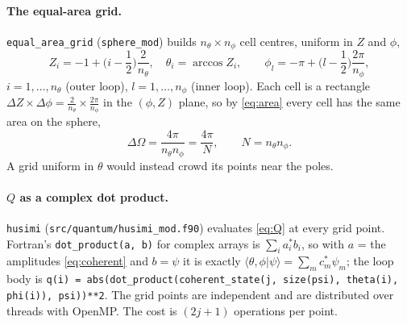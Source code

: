 \documentclass[11pt,a4paper]{article}
\begin{document}
\paragraph{The equal-area grid.} \texttt{equal\_area\_grid} (\texttt{sphere\_mod}) builds $n_\theta\times n_\phi$ cell
centres, uniform in $Z$ and $\phi$,
\begin{equation}\label{eq:grid}
  Z_i = -1 + \Big(i-\frac12\Big)\frac{2}{n_\theta},\quad \theta_i = \arccos Z_i,\qquad
  \phi_l = -\pi + \Big(l-\frac12\Big)\frac{2\pi}{n_\phi},
\end{equation}
$i = 1,\dots,n_\theta$ (outer loop), $l = 1,\dots,n_\phi$ (inner loop). Each cell is a rectangle $\Delta Z\times\Delta
\phi = \frac{2}{n_\theta}\times\frac{2\pi}{n_\phi}$ in the $(\phi,Z)$ plane, so by \eqref{eq:area} every cell has the same
area on the sphere,
\begin{equation}\label{eq:cell}
  \Delta\Omega = \frac{4\pi}{n_\theta n_\phi} = \frac{4\pi}{N},\qquad N = n_\theta n_\phi .
\end{equation}
A grid uniform in $\theta$ would instead crowd its points near the poles.

\paragraph{$Q$ as a complex dot product.} \texttt{husimi} (\texttt{src/quantum/husimi\_mod.f90}) evaluates
\eqref{eq:Q} at every grid point. Fortran's \texttt{dot\_product(a, b)} for complex arrays is $\sum_i a_i^*b_i$, so with
$a$ = the amplitudes \eqref{eq:coherent} and $b = \psi$ it is exactly $\langle\theta,\phi|\psi\rangle = \sum_m c_m^*
\psi_m$; the loop body is \lstinline!q(i) = abs(dot_product(coherent_state(j, size(psi), theta(i), phi(i)), psi))**2!.
The grid points are independent and are distributed over threads with OpenMP. The cost is $(2j+1)$ operations per point.
\end{document}

